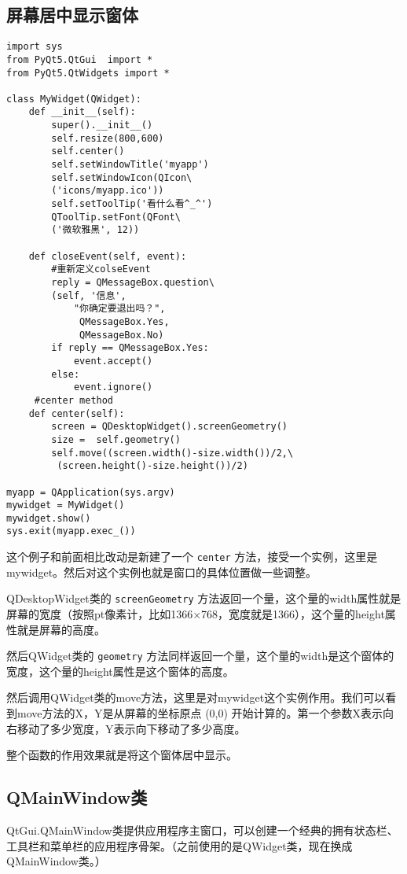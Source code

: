 \documentclass[11pt,oneside]{article}
\begin{document}
\subsection{屏幕居中显示窗体}
\label{sec:orgheadline10}
\begin{verbatim}
import sys
from PyQt5.QtGui  import *
from PyQt5.QtWidgets import *

class MyWidget(QWidget):
    def __init__(self):
        super().__init__()
        self.resize(800,600)
        self.center()
        self.setWindowTitle('myapp')
        self.setWindowIcon(QIcon\
        ('icons/myapp.ico'))
        self.setToolTip('看什么看^_^')
        QToolTip.setFont(QFont\
        ('微软雅黑', 12))

    def closeEvent(self, event):
        #重新定义colseEvent
        reply = QMessageBox.question\
        (self, '信息',
            "你确定要退出吗？",
             QMessageBox.Yes,
             QMessageBox.No)
        if reply == QMessageBox.Yes:
            event.accept()
        else:
            event.ignore()
     #center method
    def center(self):
        screen = QDesktopWidget().screenGeometry()
        size =  self.geometry()
        self.move((screen.width()-size.width())/2,\
         (screen.height()-size.height())/2)

myapp = QApplication(sys.argv)
mywidget = MyWidget()
mywidget.show()
sys.exit(myapp.exec_())
\end{verbatim}
这个例子和前面相比改动是新建了一个 \texttt{center} 方法，接受一个实例，这里是mywidget。然后对这个实例也就是窗口的具体位置做一些调整。

QDesktopWidget类的 \texttt{screenGeometry} 方法返回一个量，这个量的width属性就是屏幕的宽度（按照pt像素计，比如1366×768，宽度就是1366），这个量的height属性就是屏幕的高度。

然后QWidget类的 \texttt{geometry} 方法同样返回一个量，这个量的width是这个窗体的宽度，这个量的height属性是这个窗体的高度。

然后调用QWidget类的move方法，这里是对mywidget这个实例作用。我们可以看到move方法的X，Y是从屏幕的坐标原点 (0,0) 开始计算的。第一个参数X表示向右移动了多少宽度，Y表示向下移动了多少高度。

整个函数的作用效果就是将这个窗体居中显示。


\subsection{QMainWindow类}
\label{sec:orgheadline11}
QtGui.QMainWindow类提供应用程序主窗口，可以创建一个经典的拥有状态栏、工具栏和菜单栏的应用程序骨架。（之前使用的是QWidget类，现在换成QMainWindow类。）
\end{document}

